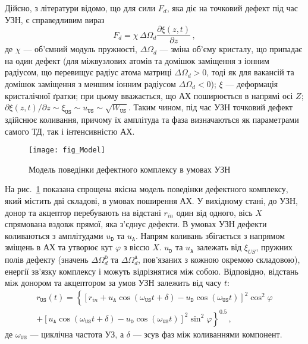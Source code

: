 Дійсно, з літератури \cite{MirzadeJAP2011,PELESHCHAK:UPJ2016} відомо, що для сили $F_d$, яка діє на точковий дефект під час УЗН,
є справедливим вираз
\begin{equation}
\label{eqFd}
F_d=\chi\,\Delta\Omega_d\frac{\partial \xi(z,t)}{\partial z}\,,
\end{equation}
де
$\chi$ --- об'ємний модуль пружності,
$\Delta\Omega_d$ --- зміна об'єму кристалу, що припадає на один дефект
(для міжвузлових атомів та домішок заміщення з іонним радіусом, що перевищує радіус атома матриці $\Delta\Omega_d > 0$,
тоді як для вакансій та домішок заміщення з меншим іонним радіусом $\Delta\Omega_d < 0$);
$\xi$ --- деформація кристалічної ґратки;
при цьому вважається, що АХ поширюється в напрямі осі $Z$;
$\partial \xi(z,t)/\partial z\sim \xi_{\mathtt{US}}\sim u_\mathtt{US} \sim \sqrt{W_\mathtt{US}}$.
Таким чином, під час УЗН точковий дефект здійснює коливання, причому їх амплітуда та фаза визначаються як параметрами самого ТД, так і інтенсивністю АХ.


\begin{figure}[b]
\center
\texttt{[image: fig\_Model]}
\caption{\label{fig_Model}
Модель поведінки дефектного комплексу в умовах УЗН
}%
\end{figure}

На рис.~\ref{fig_Model} показана спрощена якісна модель поведінки дефектного комплексу, який містить дві складові,
в умовах поширення АХ.
У вихідному стані, до УЗН, донор та акцептор перебувають на відстані $r_{in}$ один від одного,
вісь $X$ спрямована вздовж прямої, яка з'єднує дефекти.
В умовах УЗН дефекти коливаються з амплітудами $u_\mathtt{D}$ та $u_\mathtt{A}$.
Напрям коливань збігається з напрямом зміщень в АХ та утворює кут $\varphi$ з віссю $X$.
$u_\mathtt{D}$ та $u_\mathtt{A}$ залежать від $\xi_{U\!S}$, пружних полів дефекту (значень $\Delta\Omega_d^\mathtt{D}$ та $\Delta\Omega_d^\mathtt{A}$,
пов'язаних з кожною окремою складовою), енергії зв'язку комплексу і можуть відрізнятися між собою.
Відповідно, відстань між донором та акцептором за умов УЗН залежить від часу $t$:
\begin{multline}
\label{eqrUS}
r_\mathtt{US}(t)=\left\{[r_{in}+u_\mathtt{A}\cos(\omega_\mathtt{US}t+\delta)-u_\mathtt{D}\cos(\omega_\mathtt{US}t)]^2\cos^2\varphi \right.\\
    \left.+ [u_\mathtt{A}\cos(\omega_\mathtt{US}t+\delta)-u_\mathtt{D}\cos(\omega_\mathtt{US}t)]^2\sin^2\varphi\right\}^{0.5}\,,
\end{multline}
де
$\omega_\mathtt{US}$ --- циклічна частота УЗ, а
$\delta$ --- зсув фаз між коливаннями компонент.

